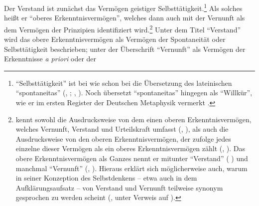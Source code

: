 Der Verstand ist zunächst das Vermögen geistiger
Selbsttätigkeit.\footnote{\enquote{Selbsttätigkeit} ist bei
 wie schon bei
 die Übersetzung des
lateinischen \enquote{spontaneitas}
\mkbibparens{\cite[vgl.][\S~15]{Kant:KritikderreinenVernunft2003}, \cite[][III:
107.7--25]{Kant:GesammelteWerke1900ff.};
\cite[][\S\,704]{Baumgarten:Metaphysica---Metaphysik2011}, \cite[][XVII:
131.26, 33]{Kant:GesammelteWerke1900ff.}}. Noch  übersetzt
\enquote{spontaneitas} hingegen als \enquote{Willkür}, wie er im ersten Register der
Deutschen Metaphysik vermerkt \parencite[vgl.][\pno~677
\mkbibparens{n.\,p.}]{Wolff:VernuenftigeGedanckenvonGottderWeltundderSeeledesMenschenauchallenDingenueberhauptDeutscheMetaphysik1983}.}
Als solches heißt er \enquote{oberes Erkenntnisvermögen}, welches dann auch mit
der Vernunft als dem Vermögen der Prinzipien identifiziert
wird.\footnote{\label{Anmerkung:ObereErkenntnisvermoegenSingularPlural}
kennt sowohl die Ausdrucksweise von dem einen oberen Erkenntnisvermögen, welches
Vernunft, Verstand und Urteilskraft umfasst \mkbibparens{\cite[siehe z.\,B.][BA
115]{Kant:AnthropologieinpragmatischerHinsicht1977},
\cite[][VII: 196.17--19]{Kant:GesammelteWerke1900ff.}}, als auch die
Ausdrucksweise von den oberen Erkenntnisvermögen, der zufolge jedes einzelne
dieser Vermögen als ein oberes Erkenntnisvermögen zählt
\mkbibparens{\cite[siehe z.\,B.][B 169]{Kant:KritikderreinenVernunft2003},
\cite[][III: 130.7--8]{Kant:GesammelteWerke1900ff.}}. Das obere
Erkenntnisvermögen als Ganzes nennt er mitunter \enquote{Verstand}
\mkbibparens{\cite[siehe z.\,B.][BA
115\,f.,]{Kant:AnthropologieinpragmatischerHinsicht1977} \cite[][VII:
196.17--197.3]{Kant:GesammelteWerke1900ff.}}
und manchmal \enquote{Vernunft} \mkbibparens{\cite[z.\,B.][B
863]{Kant:KritikderreinenVernunft2003}, \cite[][III:
540.28]{Kant:GesammelteWerke1900ff.}}. Hieraus erklärt sich
möglicherweise auch, warum in seiner Konzeption des Selbstdenkens -- etwa auch in dem Aufklärungsaufsatz -- von
Verstand und Vernunft teilweise synonym gesprochen zu werden scheint
\mkbibparens{\cite[siehe
etwa][13]{Bartuschat:KantueberPhilosophieundAufklaerung2009}, unter Verweis auf
\cite[][\pno~125\,ff.]{LaRocca:WasAufklaerungseinwird2004}}.} Unter
dem Titel \enquote{Verstand} wird das obere Erkenntnisvermögen als
Vermögen der Spontaneität oder Selbsttätigkeit beschrieben; unter der Überschrift
\enquote{Vernunft} als Vermögen der Erkenntnisse \emph{a priori} oder der
